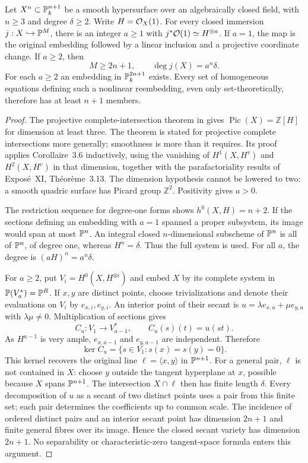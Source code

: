 \begin{theorem}
\label{sp:thm:reembedding}
Let $X^n\subset\mathbb P^{n+1}_k$ be a smooth hypersurface over an algebraically
closed field, with $n\geq3$ and degree $\delta\geq2$. Write
$H=\mathcal O_X(1)$. For every closed immersion $j:X\hookrightarrow\mathbb P^M$,
there is an integer $a\geq1$ with $j^*\mathcal O(1)\simeq H^{\otimes a}$.
If $a=1$, the map is the original embedding followed by a linear
inclusion and a projective coordinate change. If $a\geq2$, then
\[
 M\geq2n+1,\qquad \deg j(X)=a^n\delta.
\]
For each $a\geq2$ an embedding in $\mathbb P^{2n+1}_k$ exists. Every set of
homogeneous equations defining such a nonlinear reembedding, even only
set-theoretically, therefore has at least $n+1$ members.
\end{theorem}

\begin{proof}
The projective complete-intersection theorem in
\citet[Expos\'e~XII, Corollaire~3.7, p.~121]{sp-sga2} gives
$\operatorname{Pic}(X)=\mathbb Z[H]$ for dimension at least three.
The theorem is stated for projective complete intersections more
generally; smoothness is more than it requires. Its proof applies
Corollaire~3.6 inductively, using the vanishing of $H^1(X,H^v)$ and
$H^2(X,H^v)$ in that dimension, together with the parafactoriality
results of Expos\'e~XI, Th\'eor\`eme~3.13. The dimension hypothesis
cannot be lowered to two: a smooth quadric surface has Picard group
$\mathbb Z^2$. Positivity gives $a>0$.

The restriction sequence for degree-one forms shows
$h^0(X,H)=n+2$. If the sections defining an embedding with $a=1$ spanned
a proper subsystem, its image would span at most $\mathbb P^n$. An integral
closed $n$-dimensional subscheme of $\mathbb P^n$ is all of $\mathbb P^n$, of degree
one, whereas $H^n=\delta$. Thus the full system is used. For all $a$,
the degree is $(aH)^n=a^n\delta$.

For $a\geq2$, put $V_i=H^0(X,H^{\otimes i})$ and embed $X$ by its
complete system in $\mathbb P(V_a^*)=\mathbb P^R$. If $x,y$ are distinct points,
choose trivializations and denote their evaluations on $V_i$ by
$e_{x,i},e_{y,i}$. An interior point of their secant is
$u=\lambda e_{x,a}+\mu e_{y,a}$ with $\lambda\mu\ne0$.
Multiplication of sections gives
\[
 C_u:V_1\longrightarrow V_{a-1}^*,\qquad
 C_u(s)(t)=u(st).
\]
As $H^{a-1}$ is very ample, $e_{x,a-1}$ and $e_{y,a-1}$ are independent.
Therefore
\[
 \ker C_u=\{s\in V_1:s(x)=s(y)=0\}.
\]
This kernel recovers the original line $\ell=\langle x,y\rangle$ in
$\mathbb P^{n+1}$. For a general pair, $\ell$ is not contained in $X$:
choose $y$ outside the tangent hyperplane at $x$, possible because $X$
spans $\mathbb P^{n+1}$. The intersection $X\cap\ell$ then has finite length
$\delta$. Every decomposition of $u$ as a secant of two distinct points
uses a pair from this finite set; each pair determines the coefficients
up to common scale. The incidence of ordered distinct pairs and an
interior secant point has dimension $2n+1$ and finite general fibres
over its image. Hence the closed secant variety has dimension $2n+1$.
No separability or characteristic-zero tangent-space formula enters
this argument.


\end{proof}
